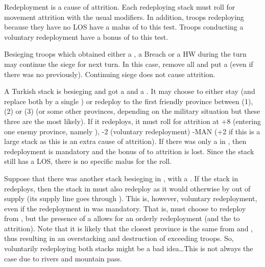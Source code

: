 \bparag Redeployment is a cause of attrition. Each redeploying stack must roll
for movement attrition with the usual modifiers.
\bparag In addition, troops redeploying because they have no LOS have a malus
of  to this test.
\bparag Troops conducting a voluntary redeployment have a bonus of 
to this test.

\bparag Besieging troops which obtained either a \USURE\Faceplus, a Breach or
a HW during the turn may continue the siege for next turn.
\bparag In this case, remove all \USURE and put a \USURE\Facemoins (even if
there was no \USURE previously).
\bparag Continuing siege does not cause attrition.

\begin{exemple}
  A Turkish stack is besieging \provinceBanat and got a \USURE\Faceplus and a
  \USURE\Facemoins. It may choose to either stay (and replace both \USURE by a
  single \USURE\Facemoins) or redeploy to the first friendly province between
  \provinceValahia (1\MP), \provinceSerbia (2\MP) or \provinceBulgaristan
  (3\MP) (or some other provinces, depending on the military situation but
  these three are the most likely). If it redeploys, it must roll for
  attrition at +8 (entering one enemy province, namely \provinceBanat), -2
  (voluntary redeployment) -MAN (+2 if this is a large stack as this is an
  extra cause of attrition). If there was only a \USURE\Facemoins in
  \provinceBanat, then redeployment is mandatory and the bonus of 
  to attrition is lost. Since the stack still has a LOS, there is no specific
  malus for the roll.
\end{exemple}

\begin{exemple}
  Suppose that there was another stack besieging \villeBuda in
  \provinceMagyarorszag, with a \USURE\Faceplus. If the stack in
  \provinceBanat redeploys, then the stack in \provinceMagyarorszag must also
  redeploy as it would otherwise by out of supply (its supply line goes
  through \provinceBanat). This is, however, voluntary redeployment, even if
  the redeployment in \provinceBanat was mandatory. That is, \TUR must choose
  to redeploy from \provinceMagyarorszag, but the presence of a
  \USURE\Faceplus allows for an orderly redeployment (and the  to
  attrition). Note that it is likely that the closest province is the same
  from \provinceBanat and \provinceMagyarorszag, thus resulting in an
  overstacking and destruction of exceeding troops. So, voluntarily
  redeploying both stacks might be a bad idea\ldots This is not always the
  case due to rivers and mountain pass.
\end{exemple}

